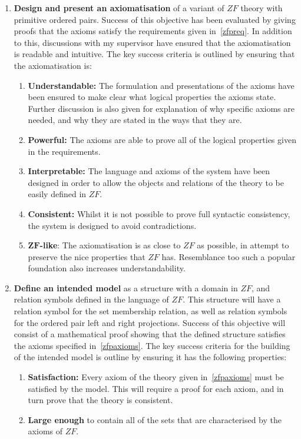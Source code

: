 \documentclass[11pt]{report}
\theoremstyle{definition}
\theoremstyle{theorem}
\theoremstyle{lemma}
\begin{document}
\begin{enumerate}
  \item \textbf{Design and present an axiomatisation} of a variant of $\mathit{ZF}$ theory with primitive ordered pairs. 
  Success of this objective has been evaluated by giving proofs that the axioms satisfy the requirements given in~\ref{zfpreq}.
  In addition to this, discussions with my supervisor have ensured that the axiomatisation is readable and intuitive. 
  The key success criteria is outlined by ensuring that the axiomatisation is: 
  \begin{enumerate}
    \item \textbf{Understandable:} The formulation and presentations of the axioms have been ensured to make clear what logical properties the axioms state. Further discussion is also given for explanation of why specific axioms are needed, and why they are stated in the ways that they are. 
    \item \textbf{Powerful:} The axioms are able to prove all of the logical properties given in the requirements. 
    \item \textbf{Interpretable:} The language and axioms of the system have been designed in order to allow the objects and relations of the theory to be easily defined in $\mathit{ZF}$.
    \item \textbf{Consistent:} Whilst it is not possible to prove full syntactic consistency, the system is designed to avoid contradictions. 
    \item \textbf{$\mathbf{ZF}$-like}: The axiomatisation is as close to $\mathit{ZF}$ as possible, in attempt to preserve the nice properties that $\mathit{ZF}$ has.
    Resemblance too such a popular foundation also increases understandability.  
  \end{enumerate}  

  \item \textbf{Define an intended model} as a structure with a domain in $\mathit{ZF}$, and relation symbols defined in the language of $\mathit{ZF}$. 
  This structure will have a relation symbol for the set membership relation, as well as relation symbols for the ordered pair left and right projections.
  Success of this objective will consist of a mathematical proof showing that the defined structure satisfies the axioms specified in~\ref{zfpaxioms}.
  The key success criteria for the building of the intended model is outline by ensuring it has the following properties:
  \begin{enumerate}
    \item \textbf{Satisfaction:} Every axiom of the theory given in~\ref{zfpaxioms} must be satisfied by the model. This will require a proof for each axiom, and in turn prove that the theory is consistent. 
    \item \textbf{Large enough} to contain all of the sets that are characterised by the axioms of $\mathit{ZF}$.
  \end{enumerate} 


\end{enumerate}
\end{document}

